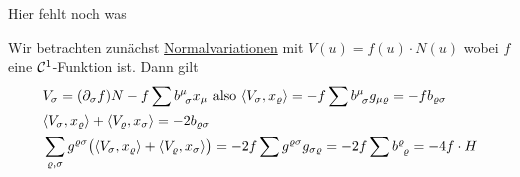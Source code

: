{\Huge Hier fehlt noch was}
\begin{beweis}
Wir betrachten zunächst \uline{Normalvariationen} mit \(V(u) = f(u) \cdot N(u)\) wobei \(f\) eine \(\mathcal{C}^1\)-Funktion ist. Dann gilt
\begin{align*}
 &V_\sigma = (\partial_\sigma f) N - f \sum b^{\mu}_{\;\, \sigma} x_\mu \text{ also } \langle V_\sigma, x_\varrho \rangle = -f \sum b^{\mu}_{\;\, \sigma} g_{\mu \varrho} = -f b_{\varrho \sigma} \\
 &\langle V_\sigma, x_\varrho \rangle + \langle V_\varrho, x_\sigma \rangle = -2 b_{\varrho \sigma} \\
 &\sum_{\varrho, \sigma} g^{\varrho \sigma} \big(\langle V_\sigma, x_\varrho \rangle + \langle V_\varrho, x_\sigma \rangle \big) = -2 f \sum g^{\varrho \sigma} g_{\sigma \varrho} = -2f \sum b^{\varrho}_{\;\, \varrho} = -4 f \cdot H
\end{align*}


\end{beweis}
